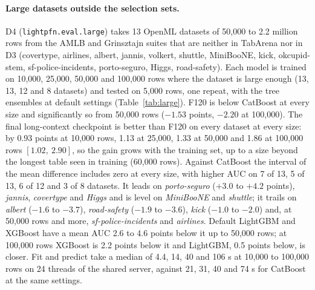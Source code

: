 \documentclass[11pt]{article}
\begin{document}
\paragraph{Large datasets outside the selection sets.} D4 (\texttt{lightpfn.eval.large}) takes 13 OpenML
datasets of 50,000 to 2.2 million rows from the AMLB and Grinsztajn suites that are neither in TabArena
nor in D3 (covertype, airlines, albert, jannis, volkert, shuttle, MiniBooNE, kick, okcupid-stem,
sf-police-incidents, porto-seguro, Higgs, road-safety). Each model is trained on 10,000, 25,000, 50,000
and 100,000 rows where the dataset is large enough (13, 13, 12 and 8 datasets) and tested on 5,000 rows,
one repeat, with the tree ensembles at default settings (Table~\ref{tab:large}). F120 is below
CatBoost at every size and significantly so from 50,000 rows ($-1.53$ points, $-2.20$ at 100,000).
The final long-context checkpoint is better than F120 on every dataset at every size: by 0.93 points
at 10,000 rows, 1.13 at 25,000, 1.33 at 50,000 and 1.86 at 100,000 rows $[1.02,\ 2.90]$, so the gain grows with
the training set, up to a size beyond the longest table seen in training (60,000 rows). Against CatBoost
the interval of the mean difference includes zero at every size, with higher AUC on 7 of 13, 5 of 13, 6 of 12 and 3 of 8
datasets. It leads on \emph{porto-seguro} ($+3.0$ to $+4.2$ points), \emph{jannis}, \emph{covertype} and \emph{Higgs}
and is level on \emph{MiniBooNE} and \emph{shuttle}; it trails on \emph{albert} ($-1.6$ to $-3.7$),
\emph{road-safety} ($-1.9$ to $-3.6$), \emph{kick} ($-1.0$ to $-2.0$) and, at 50,000 rows and more,
\emph{sf-police-incidents} and \emph{airlines}. Default LightGBM and XGBoost have a mean AUC 2.6 to 4.6 points
below it up to 50,000 rows; at 100,000 rows XGBoost is 2.2 points below it and LightGBM, 0.5 points below, is closer.
Fit and predict take a median of 4.4, 14, 40 and 106 s at 10,000 to 100,000 rows on 24 threads of the shared
server, against 21, 31, 40 and 74 s for CatBoost at the same settings.
\end{document}
